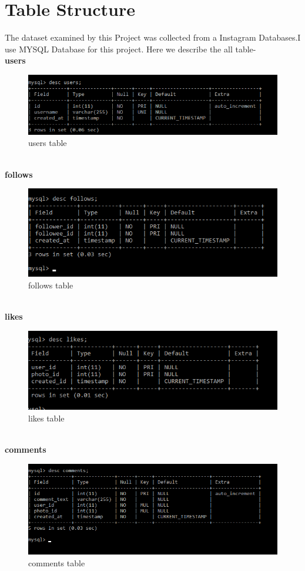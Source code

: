 \section{Table Structure}
The dataset examined by this Project was collected from a Instagram Databases.I use MYSQL Database for this project. Here we describe the all table-
\\
\textbf{users}
	 \begin{figure}[h!]
	 	\centering
	 	\includegraphics[width=0.75\linewidth]{user.png}
	 	\caption{users table}
	 \end{figure}
 \\
 \textbf{follows}
 \begin{figure}[h!]
 	\centering
 	\includegraphics[width=0.75\linewidth]{follows.png}
 	\caption{follows table}
 \end{figure}
\\
\textbf{likes}
\begin{figure}[h!]
	\centering
	\includegraphics[width=0.75\linewidth]{likes.png}
	\caption{likes table}
\end{figure}
\\
\textbf{comments}
\begin{figure}[h!]
	\centering
	\includegraphics[width=0.75\linewidth]{comments.png}
	\caption{comments table}
\end{figure}\\
